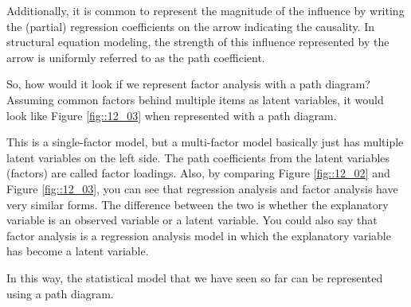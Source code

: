 \documentclass{ltjsbook}
\begin{document}
Additionally, it is common to represent the magnitude of the influence by writing the (partial) regression coefficients on the arrow indicating the causality. In structural equation modeling, the strength of this influence represented by the arrow is uniformly referred to as the path coefficient.



So, how would it look if we represent factor analysis with a path diagram? Assuming common factors behind multiple items as latent variables, it would look like Figure \ref{fig::12_03} when represented with a path diagram.

This is a single-factor model, but a multi-factor model basically just has multiple latent variables on the left side. The path coefficients from the latent variables (factors) are called factor loadings. Also, by comparing Figure \ref{fig::12_02} and Figure \ref{fig::12_03}, you can see that regression analysis and factor analysis have very similar forms. The difference between the two is whether the explanatory variable is an observed variable or a latent variable. You could also say that factor analysis is a regression analysis model in which the explanatory variable has become a latent variable.

In this way, the statistical model that we have seen so far can be represented using a path diagram.

\end{document}
